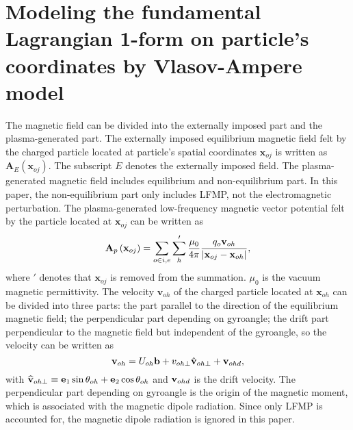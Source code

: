 \documentclass[12pt]{iopart}
\begin{document}
\section{Modeling the fundamental Lagrangian 1-form on particle's coordinates by Vlasov-Ampere model}\label{sec2}

The  magnetic field can be divided into the externally imposed part and the plasma-generated part. The externally imposed equilibrium magnetic field felt by the charged particle located at particle's spatial coordinates $\mathbf{x}_{oj}$ is written as $\mathbf{A}_{E}(\mathbf{x}_{oj})$. The subscript $E$ denotes the externally imposed field. The plasma-generated magnetic field includes equilibrium and non-equilibrium part. In this paper, the non-equilibrium part only includes LFMP, not the electromagnetic perturbation.  The plasma-generated  low-frequency magnetic vector potential felt by the particle located at $\mathbf{x}_{oj}$ can be written as
\begin{equation}\label{ap1}
{{\bf{A}}_{p}}\left( {{{\bf{x}}_{oj}}} \right) = \sum\limits_{o \in i,e} {\sum\limits_h ' {\frac{{{\mu _0}}}{{4\pi }}\frac{{{q_o}{{\bf{v}}_{oh}}}}{{|{{\bf{x}}_{oj}} - {{\bf{x}}_{oh}}|}}} },
\end{equation}
where $'$ denotes that $\mathbf{x}_{oj}$ is removed from the summation.
$\mu_0$ is the vacuum magnetic permittivity. The velocity $\mathbf{v}_{oh}$ of the charged particle located at $\mathbf{x}_{oh}$ can be divided into three parts: the part parallel to the direction of the equilibrium magnetic field; the perpendicular part depending on gyroangle; the drift part perpendicular to the magnetic field but independent of the gyroangle, so the velocity can be written as
\begin{equation}\label{ap2}
{{\bf{v}}_{oh}} = {U_{oh}}{\bf{b}} + {v_{oh \bot }}{\hat {\bf{v}}_{oh \bot }} +{{\bf{v}}_{ohd }},
\end{equation}
with ${\widehat {\bf{v}}_{oh \bot }} \equiv {{\bf{e}}_1}\sin {\theta _{oh}} + {{\bf{e}}_2}\cos {\theta _{oh}}$ and ${{\bf{v}}_{ohd }}$ is the drift velocity.
The perpendicular part depending on gyroangle is the origin of the magnetic moment, which is associated with the magnetic dipole radiation. Since only LFMP is accounted for, the magnetic dipole radiation is ignored in this paper.
\end{document}
